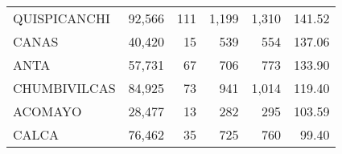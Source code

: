 \begin{tabular}{lrrrrr}
	\cellcolor[HTML]{FFFC9E}QUISPICANCHI                                              & 92,566                                                         & 111                                                      & 1,199                                                    & 1,310                                                               & 141.52                                                                       \\
	\cellcolor[HTML]{FFFC9E}CANAS                                                     & 40,420                                                         & 15                                                       & 539                                                      & 554                                                                 & 137.06                                                                       \\
	\cellcolor[HTML]{FFFC9E}ANTA                                                      & 57,731                                                         & 67                                                       & 706                                                      & 773                                                                 & 133.90                                                                       \\
	\cellcolor[HTML]{9AFF99}CHUMBIVILCAS                                              & 84,925                                                         & 73                                                       & 941                                                      & 1,014                                                               & 119.40                                                                       \\
	\cellcolor[HTML]{9AFF99}ACOMAYO                                                   & 28,477                                                         & 13                                                       & 282                                                      & 295                                                                 & 103.59                                                                       \\
	\cellcolor[HTML]{9AFF99}CALCA                                                     & 76,462                                                         & 35                                                       & 725                                                      & 760                                                                 & 99.40                                                                        \\

\end{tabular}
